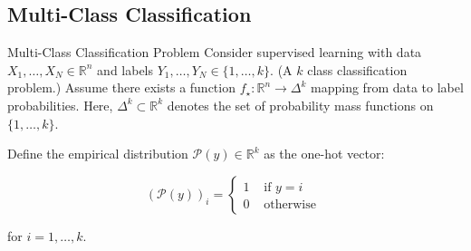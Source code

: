 \subsection{Multi-Class Classification}

\begin{frame}[allowframebreaks]

\begin{mydefinitionblock}{4.6}{Multi-Class Classification Problem}
    Consider supervised learning with data $X_{1}, \ldots, X_{N} \in \mathbb{R}^{n}$ and labels $Y_{1}, \ldots, Y_{N} \in\{1, \ldots, k\}$. (A $k$ class classification problem.) Assume there exists a function $f_{\star}: \mathbb{R}^{n} \rightarrow \Delta^{k}$ mapping from data to label probabilities. Here, $\Delta^{k} \subset \mathbb{R}^{k}$ denotes the set of probability mass functions on $\{1, \ldots, k\}$.

    Define the empirical distribution $\mathcal{P}(y) \in \mathbb{R}^{k}$ as the one-hot vector:

    $$
    (\mathcal{P}(y))_{i}=\left\{\begin{array}{cc}
    1 & \text { if } y=i \\
    0 & \text { otherwise }
    \end{array}\right.
    $$

    for $i=1, \ldots, k$.
\end{mydefinitionblock}

\end{frame}

